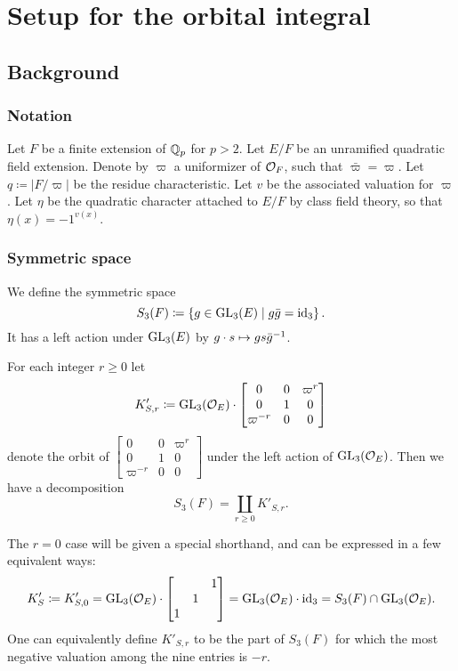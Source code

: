 \section{Setup for the orbital integral}
\subsection{Background}
\label{sec:orbital_background}

\subsubsection{Notation}
\begin{itemize}
  \ii Let $F$ be a finite extension of $\mathbb Q_p$ for $p > 2$.
  \ii Let $E/F$ be an unramified quadratic field extension.
  \ii Denote by $\varpi$ a uniformizer of $\mathcal O_F$, such that $\bar \varpi = \varpi$.
  \ii Let $q \coloneqq |F/\varpi|$ be the residue characteristic.
  \ii Let $v$ be the associated valuation for $\varpi$.
  \ii Let $\eta$ be the quadratic character attached to $E/F$ by class field theory,
  so that $\eta(x) = -1^{v(x)}$.
\end{itemize}

\subsubsection{Symmetric space}
We define the symmetric space
\[ S_3(F) \coloneqq \left\{ g \in \operatorname{GL}_3(E) \mid g \bar{g} = \operatorname{id}_3 \right\}. \]
It has a left action under $\operatorname{GL}_3(E)$ by $g \cdot s \mapsto gs\bar{g}^{-1}$.
\begin{lemma}
  For each integer $r \ge 0$ let
  \[ K'_{S,r} \coloneqq \operatorname{GL}_3(\mathcal O_E) \cdot \begin{bmatrix} 0 & 0 & \varpi^r \\ 0 & 1 & 0 \\ \varpi^{-r} & 0 & 0 \end{bmatrix} \]
  denote the orbit of
  $\begin{bmatrix} 0 & 0 & \varpi^r \\ 0 & 1 & 0 \\ \varpi^{-r} & 0 & 0 \end{bmatrix}$
  under the left action of $\operatorname{GL}_3(\mathcal O_E)$.
  Then we have a decomposition
  \[ S_3(F) = \coprod_{r \geq 0} K'_{S,r}. \]
\end{lemma}
The $r=0$ case will be given a special shorthand,
and can be expressed in a few equivalent ways:
\[ K'_S \coloneqq K'_{S,0}
  = \operatorname{GL}_3(\mathcal O_E) \cdot \begin{bmatrix} & & 1 \\ & 1 \\ 1 \end{bmatrix}
  = \operatorname{GL}_3(\mathcal O_E) \cdot \operatorname{id}_3 = S_3(F) \cap \operatorname{GL}_3(\mathcal O_E). \]
One can equivalently define $K'_{S,r}$ to be the part of $S_3(F)$
for which the most negative valuation among the nine entries is $-r$.

